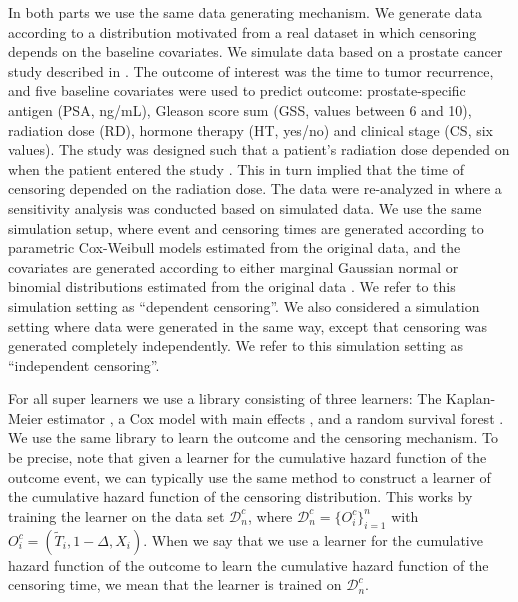 \documentclass{statsoc}
\newcommand{\1}{\mathds{1}}
\newcommand{\data}{\ensuremath{\mathcal{D}}}
\begin{document}
In both parts we use the same data generating mechanism. We generate
data according to a distribution motivated from a real dataset in
which censoring depends on the baseline covariates. We simulate data
based on a prostate cancer study described in
\citep{kattan2000pretreatment}. The outcome of interest was the time
to tumor recurrence, and five baseline covariates were used to predict
outcome: prostate-specific antigen (PSA, ng/mL), Gleason score sum
(GSS, values between 6 and 10), radiation dose (RD), hormone therapy
(HT, yes/no) and clinical stage (CS, six values). The study was
designed such that a patient's radiation dose depended on when the
patient entered the study \citep{gerds2013estimating}. This in turn
implied that the time of censoring depended on the radiation dose. The
data were re-analyzed in \citep{gerds2013estimating} where a
sensitivity analysis was conducted based on simulated data. We use the
same simulation setup, where event and censoring times are generated
according to parametric Cox-Weibull models estimated from the original
data, and the covariates are generated according to either marginal
Gaussian normal or binomial distributions estimated from the original
data \citep[c.f.,][Section~4.6]{gerds2013estimating}. We refer to this
simulation setting as ``dependent censoring''. We also considered a
simulation setting where data were generated in the same way, except
that censoring was generated completely independently. We refer to
this simulation setting as ``independent censoring''.

For all super learners we use a library consisting of three learners: The
Kaplan-Meier estimator \citep{kaplan1958nonparametric,Gerds_2019prodlim}, a Cox
model with main effects \citep{cox1972regression, survival-package}, and a
random survival forest \citep{ishwaran2008random,rfsrc-paclage}. We use the same
library to learn the outcome and the censoring mechanism. To be precise, note
that given a learner for the cumulative hazard function of the outcome event, we
can typically use the same method to construct a learner of the cumulative
hazard function of the censoring distribution. This works by training the
learner on the data set \( \data_n^c \), where
\( \data_n^c = \{O_i^c\}_{i=1}^n \) with
\( O_i^c = (\tilde{T}_i, 1-\Delta, X_i) \). When we say that we use a learner
for the cumulative hazard function of the outcome to learn the cumulative hazard
function of the censoring time, we mean that the learner is trained on
\( \data_n^c \).
\end{document}
